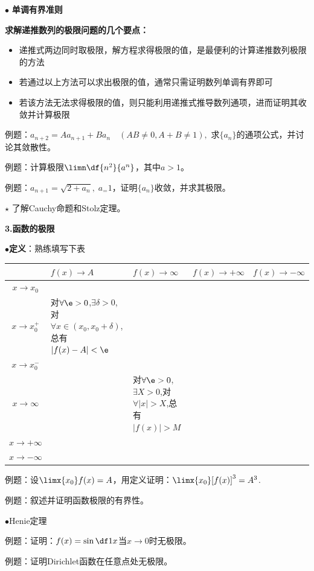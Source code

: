 $\bullet$ {\bf 单调有界准则}

{\bf 求解递推数列的极限问题的几个要点：}
\begin{itemize}
  \setlength{\itemindent}{1cm}
  \item 递推式两边同时取极限，解方程求得极限的值，是最便利的计算递推数列极限的方法
  \item 若通过以上方法可以求出极限的值，通常只需证明数列单调有界即可
  \item 若该方法无法求得极限的值，则只能利用递推式推导数列通项，进而证明其收敛并计算极限
\end{itemize}

例题：$a_{n+2}=Aa_{n+1}+Ba_n\quad (AB\ne 0, A+B\ne 1),$
求$\{a_n\}$的通项公式，并讨论其敛散性。

例题：计算极限$\limn\df{n^2}{a^n}$，其中$a>1$。

例题：$a_{n+1}=\sqrt{2+a_n},\;a_=1$，证明$\{a_n\}$收敛，并求其极限。

$\star$ 了解Cauchy命题和Stolz定理。

{\bf 3.函数的极限}

$\bullet${\bf 定义}：熟练填写下表

\renewcommand\arraystretch{1.2}

\begin{tabular}{c|p{3cm}|p{3cm}|p{3cm}|p{3cm}}
	\toprule[2pt]
	& $f(x)\to A$ & $f(x)\to\infty$ 
	& $f(x)\to+\infty$&
 	$f(x)\to-\infty$ \\ 
	\midrule[1pt]
	$x\to x_0$ & & & &\\
	\midrule[1pt]
	$x\to x_0^+$ &对$\forall\e>0$,$\exists\delta>0$,对$\forall
	x\in(x_0,x_0+\delta)$,总有$|f(x)-A|<\e$ & & &\\
	\midrule[1pt]
	$x\to x_0^-$ & & & &\\
	\midrule[1pt]
	$x\to\infty$ & & 对$\forall\e>0$,$\exists X>0$,对$\forall|x|>X$,总有$|f(x)|>M$ &
	&\\
	\midrule[1pt]
	$x\to+\infty$ & & & &\\
	\midrule[1pt]
	$x\to-\infty$ & & & &\\
	\bottomrule[2pt]
\end{tabular}

例题：设$\limx{x_0}f(x)=A$，用定义证明：$\limx{x_0}[f(x)]^3=A^3$.

例题：叙述并证明函数极限的有界性。

$\bullet${Henie定理}

例题：证明：$f(x)=\sin\df 1x$当$x\to 0$时无极限。

例题：证明Dirichlet函数在任意点处无极限。

